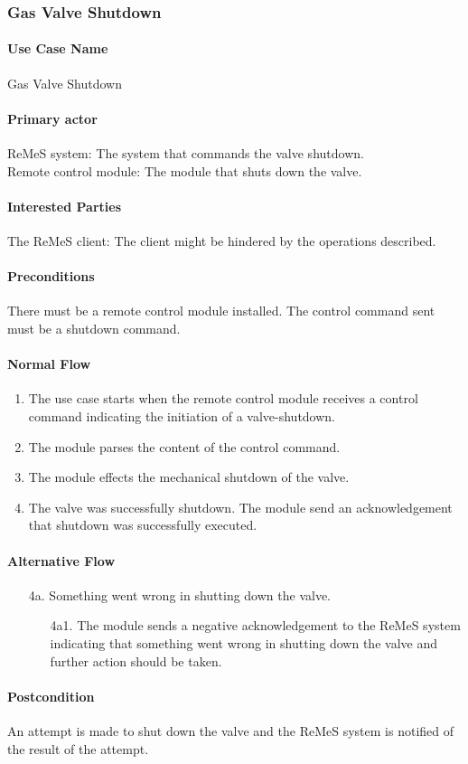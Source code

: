 \subsubsection{Gas Valve Shutdown}

\paragraph{Use Case Name}
Gas Valve Shutdown 
\paragraph{Primary actor}
ReMeS system: The system that commands the valve shutdown.\\
Remote control module: The module that shuts down the valve.
\paragraph{Interested Parties}
The ReMeS client: The client might be hindered by the operations described.
\paragraph{Preconditions}
There must be a remote control module installed.
The control command sent must be a shutdown command.
\paragraph{Normal Flow}
\begin{enumerate}
	\item The use case starts when the remote control module receives a control command indicating the initiation of a valve-shutdown.
	\item The module parses the content of the control command.
	\item The module effects the mechanical shutdown of the valve.
	\item The valve was successfully shutdown. The module send an acknowledgement that shutdown was successfully executed. 
\end{enumerate}

\paragraph{Alternative Flow}
\begin{enumerate}
	\item[4a.] Something went wrong in shutting down the valve.
	\begin{enumerate}
		\item[4a1.] The module sends a negative acknowledgement to the ReMeS system indicating that something went wrong in shutting down the valve and further action should be taken. 
	\end{enumerate}
\end{enumerate}

\paragraph{Postcondition}
An attempt is made to shut down the valve and the ReMeS system is notified of the result of the attempt.
